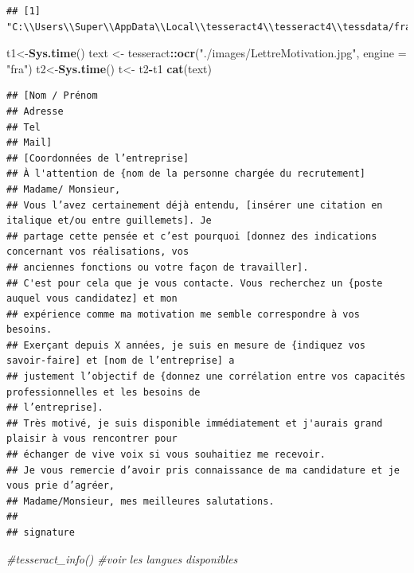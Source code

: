 \documentclass[
]{book}
\newenvironment{Shaded}{\begin{snugshade}}{\end{snugshade}}
\newcommand{\CommentTok}[1]{\textcolor[rgb]{0.56,0.35,0.01}{\textit{#1}}}
\newcommand{\DataTypeTok}[1]{\textcolor[rgb]{0.13,0.29,0.53}{#1}}
\newcommand{\KeywordTok}[1]{\textcolor[rgb]{0.13,0.29,0.53}{\textbf{#1}}}
\newcommand{\NormalTok}[1]{#1}
\newcommand{\OperatorTok}[1]{\textcolor[rgb]{0.81,0.36,0.00}{\textbf{#1}}}
\newcommand{\StringTok}[1]{\textcolor[rgb]{0.31,0.60,0.02}{#1}}
\begin{document}
\begin{verbatim}
## [1] "C:\\Users\\Super\\AppData\\Local\\tesseract4\\tesseract4\\tessdata/fra.traineddata"
\end{verbatim}

\begin{Shaded}
\begin{Highlighting}[]
\NormalTok{t1<-}\KeywordTok{Sys.time}\NormalTok{()}
\NormalTok{text <-}\StringTok{ }\NormalTok{tesseract}\OperatorTok{::}\KeywordTok{ocr}\NormalTok{(}\StringTok{"./images/LettreMotivation.jpg"}\NormalTok{, }\DataTypeTok{engine =} \StringTok{"fra"}\NormalTok{)}
\NormalTok{t2<-}\KeywordTok{Sys.time}\NormalTok{()}
\NormalTok{t<-}\StringTok{ }\NormalTok{t2}\OperatorTok{-}\NormalTok{t1}
\KeywordTok{cat}\NormalTok{(text)}
\end{Highlighting}
\end{Shaded}

\begin{verbatim}
## [Nom / Prénom
## Adresse
## Tel
## Mail]
## [Coordonnées de l’entreprise]
## À l'attention de {nom de la personne chargée du recrutement]
## Madame/ Monsieur,
## Vous l’avez certainement déjà entendu, [insérer une citation en italique et/ou entre guillemets]. Je
## partage cette pensée et c’est pourquoi [donnez des indications concernant vos réalisations, vos
## anciennes fonctions ou votre façon de travailler].
## C'est pour cela que je vous contacte. Vous recherchez un {poste auquel vous candidatez] et mon
## expérience comme ma motivation me semble correspondre à vos besoins.
## Exerçant depuis X années, je suis en mesure de {indiquez vos savoir-faire] et [nom de l’entreprise] a
## justement l’objectif de {donnez une corrélation entre vos capacités professionnelles et les besoins de
## l’entreprise].
## Très motivé, je suis disponible immédiatement et j'aurais grand plaisir à vous rencontrer pour
## échanger de vive voix si vous souhaitiez me recevoir.
## Je vous remercie d’avoir pris connaissance de ma candidature et je vous prie d’agréer,
## Madame/Monsieur, mes meilleures salutations.
## 
## signature
\end{verbatim}

\begin{Shaded}
\begin{Highlighting}[]
\CommentTok{#tesseract_info() #voir les langues disponibles}
\end{Highlighting}
\end{Shaded}
\end{document}
